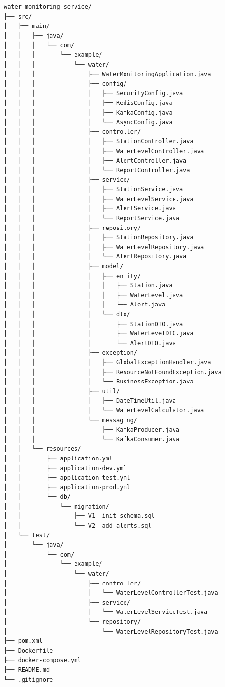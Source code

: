 \begin{lstlisting}
water-monitoring-service/
├── src/
│   ├── main/
│   │   ├── java/
│   │   │   └── com/
│   │   │       └── example/
│   │   │           └── water/
│   │   │               ├── WaterMonitoringApplication.java
│   │   │               ├── config/
│   │   │               │   ├── SecurityConfig.java
│   │   │               │   ├── RedisConfig.java
│   │   │               │   ├── KafkaConfig.java
│   │   │               │   └── AsyncConfig.java
│   │   │               ├── controller/
│   │   │               │   ├── StationController.java
│   │   │               │   ├── WaterLevelController.java
│   │   │               │   ├── AlertController.java
│   │   │               │   └── ReportController.java
│   │   │               ├── service/
│   │   │               │   ├── StationService.java
│   │   │               │   ├── WaterLevelService.java
│   │   │               │   ├── AlertService.java
│   │   │               │   └── ReportService.java
│   │   │               ├── repository/
│   │   │               │   ├── StationRepository.java
│   │   │               │   ├── WaterLevelRepository.java
│   │   │               │   └── AlertRepository.java
│   │   │               ├── model/
│   │   │               │   ├── entity/
│   │   │               │   │   ├── Station.java
│   │   │               │   │   ├── WaterLevel.java
│   │   │               │   │   └── Alert.java
│   │   │               │   └── dto/
│   │   │               │       ├── StationDTO.java
│   │   │               │       ├── WaterLevelDTO.java
│   │   │               │       └── AlertDTO.java
│   │   │               ├── exception/
│   │   │               │   ├── GlobalExceptionHandler.java
│   │   │               │   ├── ResourceNotFoundException.java
│   │   │               │   └── BusinessException.java
│   │   │               ├── util/
│   │   │               │   ├── DateTimeUtil.java
│   │   │               │   └── WaterLevelCalculator.java
│   │   │               └── messaging/
│   │   │                   ├── KafkaProducer.java
│   │   │                   └── KafkaConsumer.java
│   │   └── resources/
│   │       ├── application.yml
│   │       ├── application-dev.yml
│   │       ├── application-test.yml
│   │       ├── application-prod.yml
│   │       └── db/
│   │           └── migration/
│   │               ├── V1__init_schema.sql
│   │               └── V2__add_alerts.sql
│   └── test/
│       └── java/
│           └── com/
│               └── example/
│                   └── water/
│                       ├── controller/
│                       │   └── WaterLevelControllerTest.java
│                       ├── service/
│                       │   └── WaterLevelServiceTest.java
│                       └── repository/
│                           └── WaterLevelRepositoryTest.java
├── pom.xml
├── Dockerfile
├── docker-compose.yml
├── README.md
└── .gitignore
\end{lstlisting}

